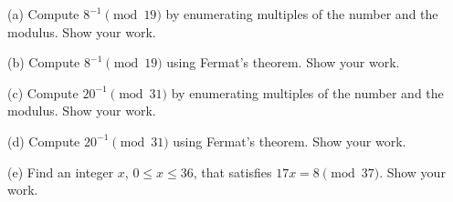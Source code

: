 
\begin{problem}
(a) Compute $8^{-1}\pmod{19}$ by enumerating multiples of the number and the modulus.
Show your work.

\smallskip\noindent
(b) Compute $8^{-1}\pmod{19}$ using Fermat's theorem. Show your work.

\smallskip\noindent
(c) Compute $20^{-1}\pmod{31}$ by enumerating multiples of the number and the modulus.
Show your work.

\smallskip\noindent
(d) Compute $20^{-1}\pmod{31}$ using Fermat's theorem. Show your work.

\smallskip\noindent
(e) Find an integer $x$, $0\le x \le 36$, that satisfies
$17x = 8 \pmod{37}$. Show your work.
\end{problem}


